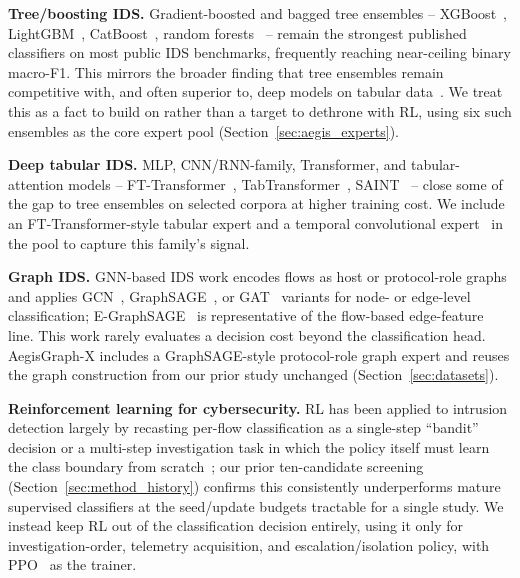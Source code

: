 \documentclass[journal]{IEEEtran}
\begin{document}
\textbf{Tree/boosting IDS.} Gradient-boosted and bagged tree ensembles --
XGBoost~\cite{chen2016xgboost}, LightGBM~\cite{ke2017lightgbm},
CatBoost~\cite{prokhorenkova2018catboost}, random
forests~\cite{breiman2001randomforests} -- remain the strongest published
classifiers on most public IDS benchmarks, frequently reaching near-ceiling
binary macro-F1. This mirrors the broader finding that tree ensembles remain
competitive with, and often superior to, deep models on tabular
data~\cite{grinsztajn2022trees,shwartzziv2022tabular}. We treat this as a
fact to build on rather than a target to dethrone with RL, using six such
ensembles as the core expert pool (Section~\ref{sec:aegis_experts}).

\textbf{Deep tabular IDS.} MLP, CNN/RNN-family, Transformer, and
tabular-attention models -- FT-Transformer~\cite{gorishniy2021revisiting},
TabTransformer~\cite{huang2020tabtransformer}, SAINT~\cite{somepalli2021saint}
-- close some of the gap to tree ensembles on selected corpora at higher
training cost. We include an FT-Transformer-style tabular expert and a
temporal convolutional expert~\cite{bai2018tcn} in the pool to capture this
family's signal.

\textbf{Graph IDS.} GNN-based IDS work encodes flows as host or protocol-role
graphs and applies GCN~\cite{kipf2017gcn},
GraphSAGE~\cite{hamilton2017graphsage}, or GAT~\cite{velickovic2018gat}
variants for node- or edge-level classification;
E-GraphSAGE~\cite{lo2022egraphsage} is representative of the flow-based
edge-feature line. This work rarely evaluates a decision cost beyond the
classification head. AegisGraph-X includes a GraphSAGE-style protocol-role
graph expert and reuses the graph construction from our prior study
unchanged (Section~\ref{sec:datasets}).

\textbf{Reinforcement learning for cybersecurity.} RL has been applied to
intrusion detection largely by recasting per-flow classification as a
single-step ``bandit'' decision or a multi-step investigation task in which
the policy itself must learn the class boundary from
scratch~\cite{nguyen2019drlcyber}; our prior ten-candidate screening
(Section~\ref{sec:method_history}) confirms this consistently underperforms
mature supervised classifiers at the seed/update budgets tractable for a
single study. We instead keep RL out of the classification decision
entirely, using it only for investigation-order, telemetry acquisition, and
escalation/isolation policy, with PPO~\cite{schulman2017ppo} as the trainer.
\end{document}
